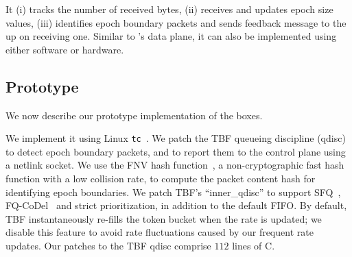 \Para{\capoutbox} It (i) tracks the number of received bytes, (ii) receives and updates epoch size values, (iii) identifies epoch boundary packets and sends feedback message to the \inbox up on receiving one. Similar to \inbox's data plane, it can also be implemented using either software or hardware.




\subsection{Prototype}\label{s:impl:prototype}

We now describe our prototype implementation of the \name boxes.

 We implement it using Linux \texttt{tc}~\cite{tc}.
We patch the TBF queueing discipline (qdisc)~\cite{tbf} to detect epoch boundary packets, and to report them to the control plane using a netlink socket. We use the FNV hash function~\cite{fnv-hash}, a non-cryptographic fast hash function with a low collision rate, to compute the packet content hash for identifying epoch boundaries.
We patch TBF's ``inner\_qdisc'' to support SFQ~\cite{sfq}, FQ-CoDel~\cite{fq-codel} and strict prioritization, in addition to the default FIFO. 
By default, TBF instantaneously re-fills the token bucket when the rate is updated; we disable this feature to avoid rate fluctuations caused by our frequent rate updates. 
Our patches to the TBF qdisc comprise $112$ lines of C.

